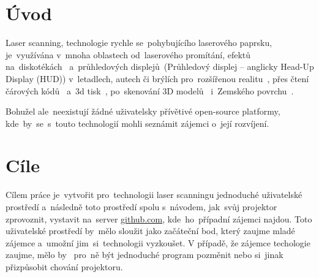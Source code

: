 \chapter*{Úvod}


Laser scanning, technologie rychle se~pohybujícího laserového paprsku, je~využívána v~mnoha oblastech od~laserového promítání, efektů na~diskotékách~\cite{laser-projection} a~průhledových displejů~(Průhledový displej -- anglicky Head-Up Display (HUD)) v~letadlech, autech či brýlích  pro~rozšířenou realitu~\cite{laser-huds}, přes čtení čárových kódů~\cite{history-of-barcode-scanning} a~3d tisk~\cite{Photo-curing-3D-printing}, po~skenování 3D modelů~\cite{3d-model-scan} i~Zemského povrchu~\cite{heightmaps}.

Bohužel  ale~neexistují žádné uživatelsky přívětivé open-source platformy,  kde~by~se~s~touto technologií mohli seznámit zájemci o~její rozvíjení.

\chapter{Cíle}
Cílem práce je~vytvořit  pro~technologii laser scanningu jednoduché uživatelské prostředí  a~následně toto prostředí spolu  s~návodem,  jak~svůj projektor zprovoznit, vystavit na~server \url{github.com},  kde~ho~případní zájemci najdou.
Toto uživatelské prostředí by~mělo sloužit jako začáteční bod, který zaujme mladé zájemce a~umožní  jim~si~technologii vyzkoušet.
V případě, že zájemce techologie zaujme, mělo by ~pro~ně být jednoduché program pozměnit nebo si~jinak přizpůsobit chování projektoru.
